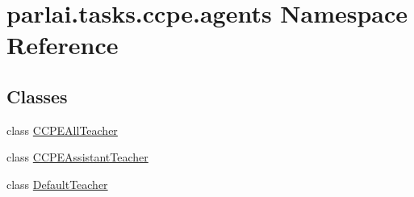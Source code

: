\hypertarget{namespaceparlai_1_1tasks_1_1ccpe_1_1agents}{}\section{parlai.\+tasks.\+ccpe.\+agents Namespace Reference}
\label{namespaceparlai_1_1tasks_1_1ccpe_1_1agents}
\subsection*{Classes}
\begin{DoxyCompactItemize}
\item 
class \hyperlink{classparlai_1_1tasks_1_1ccpe_1_1agents_1_1CCPEAllTeacher}{C\+C\+P\+E\+All\+Teacher}
\item 
class \hyperlink{classparlai_1_1tasks_1_1ccpe_1_1agents_1_1CCPEAssistantTeacher}{C\+C\+P\+E\+Assistant\+Teacher}
\item 
class \hyperlink{classparlai_1_1tasks_1_1ccpe_1_1agents_1_1DefaultTeacher}{Default\+Teacher}
\end{DoxyCompactItemize}
